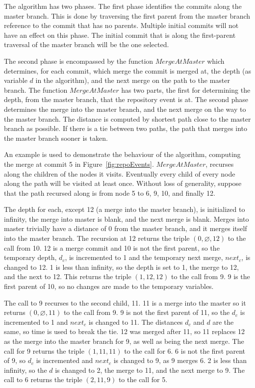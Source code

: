 The algorithm has two phases.
The first phase identifies the commits along the master branch.
This is done by traversing the first parent from the master branch
reference to the commit that has no parents.
Multiple initial commits will not have an effect on this phase.
The initial commit that is along the first-parent traversal of the
master branch will be the one selected.

The second phase is encompassed by the function
$MergeAtMaster$ which determines, for each commit, which merge the
commit is merged at, the depth (as variable $d$ in the algorithm), and
the next merge on the path to the master branch.
The function $MergeAtMaster$ has two parts,
the first for determining the depth,
from the master branch,
that the repository event is at.
The second phase determines the merge into the master branch,
and the next merge on the way to the master branch.
The distance is computed by shortest path close to the master branch as
possible.
If there is a tie between two paths, the path that merges into the
master branch sooner is taken.

An example is used to demonstrate the behaviour of the algorithm,
computing the merge at commit 5 in Figure~\ref{fig:repoEvents}.
$MergeAtMaster$, recurses along the children of the nodes it visits.
Eventually every child of every node along the path will be visited at
least once. Without loss of generality, suppose that the path recursed
along is from node 5 to 6, 9, 10, and finally 12.

The depth for each, except 12 (a merge into the master branch), is
initialized to infinity, the merge into master is blank, and the next
merge is blank. Merges into master trivially have a distance of 0 from
the master branch, and it merges itself into the master branch. The
recursion at 12 returns the triple $(0, \varnothing, 12)$ to the call
from 10. 12 is a merge commit and 10 is not the first parent, so the
temporary depth, $d_c$, is incremented to 1 and the temporary next
merge, $next_c$, is changed to 12. 1 is less than infinity, so the depth
is set to 1, the merge to 12, and the next to 12. This returns the
triple $(1, 12, 12)$ to the call from 9. 9 is the first parent of 10, so
no changes are made to the temporary variables.

The call to 9 recurses to the second child, 11. 11 is a merge into the
master so it returns $(0, \varnothing, 11)$ to the call from 9. 9 is not
the first parent of 11, so the $d_c$ is incremented to 1 and $next_c$ is
changed to 11. The distances $d_c$ and $d$ are the same, so time is used
to break the tie. 12 was merged after 11, so 11 replaces 12 as the
merge into the master branch for 9, as well as being the next merge. The
call for 9 returns the triple $(1, 11, 11)$ to the call for 6. 6 is not
the first parent of 9, so $d_c$ is incremented and $next_c$ is changed
to 9, as 9 merges 6. 2 is less than infinity, so the $d$ is changed to
2, the merge to 11, and the next merge to 9. The call to 6 returns the
triple $(2, 11, 9)$ to the call for 5.


